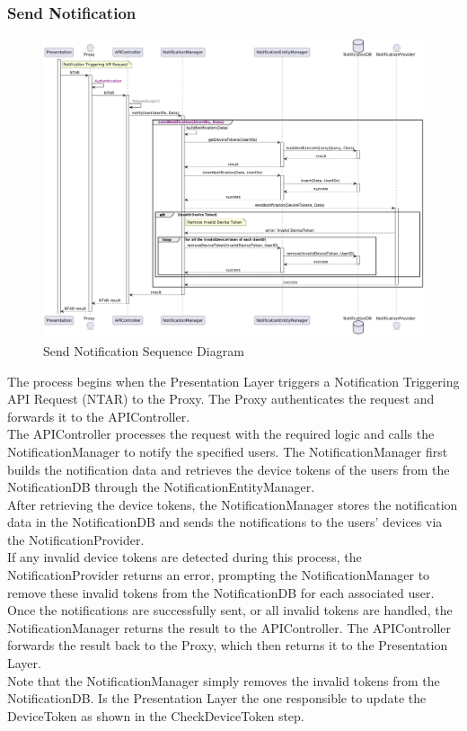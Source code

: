 \subsubsection*{Send Notification}
\begin{figure}[H]
    \centering
    \includegraphics[width=\linewidth]{Latex/Images/DD/SequenceDiagrams/3.1SendNotification.png}
    \caption{Send Notification Sequence Diagram}
    \label{fig:sendnotification}
\end{figure}
The process begins when the Presentation Layer triggers a Notification Triggering API Request (NTAR) to the Proxy. The Proxy authenticates the request and forwards it to the APIController.\\
The APIController processes the request with the required logic and calls the NotificationManager to notify the specified users. The NotificationManager first builds the notification data and retrieves the device tokens of the users from the NotificationDB through the NotificationEntityManager.\\
After retrieving the device tokens, the NotificationManager stores the notification data in the NotificationDB and sends the notifications to the users' devices via the NotificationProvider.\\
If any invalid device tokens are detected during this process, the NotificationProvider returns an error, prompting the NotificationManager to remove these invalid tokens from the NotificationDB for each associated user.\\
Once the notifications are successfully sent, or all invalid tokens are handled, the NotificationManager returns the result to the APIController. The APIController forwards the result back to the Proxy, which then returns it to the Presentation Layer.\\
Note that the NotificationManager simply removes the invalid tokens from the NotificationDB. Is the Presentation Layer the one responsible to update the DeviceToken as shown in the CheckDeviceToken step.

